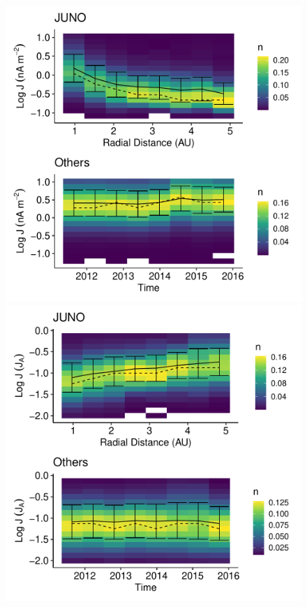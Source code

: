 \documentclass[
]{agujournal2019}
\begin{document}
\begin{figure}

\begin{minipage}{0.50\linewidth}
\includegraphics{figures/current/current_k_dist.pdf}\end{minipage}%
%
\begin{minipage}{0.50\linewidth}
\includegraphics{figures/current/current_k_N1_dist.pdf}\end{minipage}%

\end{figure}%
\end{document}
